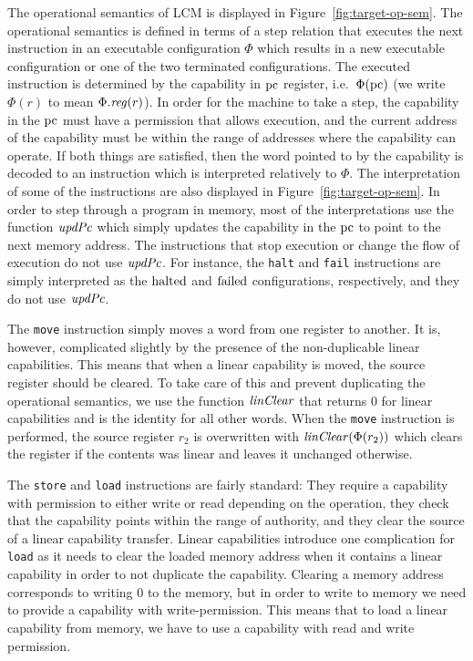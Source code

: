 \documentclass[acmsmall,review,anonymous]{acmart}\settopmatter{printfolios=true,printccs=false,printacmref=false}
\renewcommand{\updPcAddr}[1]{\plainfun{updPc}{#1}}
\renewcommand{\linCons}[1]{\plainfun{linClear}{#1}}
\newcommand{\trgcm}{\textsc{LCM}}
\begin{document}
The operational semantics of \trgcm{} is displayed in Figure~\ref{fig:target-op-sem}.
The operational semantics is defined in terms of a step relation that executes the next instruction in an executable configuration $\Phi$ which results in a new executable configuration or one of the two terminated configurations.
The executed instruction is determined by the capability in $\mathrm{pc}$ register, i.e.\ $\Phi(\mathrm{pc})$ (we write $\Phi(r)$ to mean $\Phi.\reg(r)$).
In order for the machine to take a step, the capability in the $\mathrm{pc}$ must have a permission that allows execution, and the current address of the capability must be within the range of addresses where the capability can operate.
If both things are satisfied, then the word pointed to by the capability is decoded to an instruction which is interpreted relatively to $\Phi$.
The interpretation of some of the instructions are also displayed in Figure~\ref{fig:target-op-sem}.
In order to step through a program in memory, most of the interpretations use the function $\updPcAddr{}$ which simply updates the capability in the $\mathrm{pc}$ to point to the next memory address.
The instructions that stop execution or change the flow of execution do not use $\updPcAddr{}$.
For instance, the \texttt{halt} and \texttt{fail} instructions are simply interpreted as the $\mathrm{halted}$ and $\mathrm{failed}$ configurations, respectively, and they do not use $\updPcAddr{}$.

The \texttt{move} instruction simply moves a word from one register to another.
It is, however, complicated slightly by the presence of the non-duplicable linear capabilities.
This means that when a linear capability is moved, the source register should be cleared.
To take care of this and prevent duplicating the operational semantics, we use the function $\linCons{}$ that returns $0$ for linear capabilities and is the identity for all other words.
When the \texttt{move} instruction is performed, the source register $r_2$ is overwritten with $\linCons{\Phi(r_2)}$ which clears the register if the contents was linear and leaves it unchanged otherwise.

The \texttt{store} and \texttt{load} instructions are fairly standard: They require a capability with permission to either write or read depending on the operation, they check that the capability points within the range of authority, and they clear the source of a linear capability transfer.
Linear capabilities introduce one complication for \texttt{load} as it needs to clear the loaded memory address when it contains a linear capability in order to not duplicate the capability.
Clearing a memory address corresponds to writing $0$ to the memory, but in order to write to memory we need to provide a capability with write-permission.
This means that to load a linear capability from memory, we have to use a capability with read and write permission.
\end{document}
